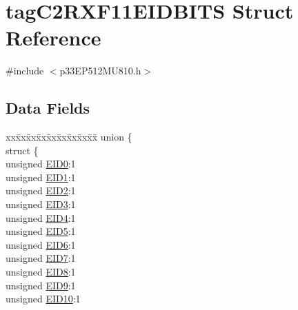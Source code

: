 \hypertarget{structtag_c2_r_x_f11_e_i_d_b_i_t_s}{}\section{tag\+C2\+R\+X\+F11\+E\+I\+D\+B\+I\+TS Struct Reference}
\label{structtag_c2_r_x_f11_e_i_d_b_i_t_s}


{\ttfamily \#include $<$p33\+E\+P512\+M\+U810.\+h$>$}

\subsection*{Data Fields}
\begin{DoxyCompactItemize}
\item 
\begin{tabbing}
xx\=xx\=xx\=xx\=xx\=xx\=xx\=xx\=xx\=\kill
union \{\\
\>struct \{\\
\>\>unsigned \hyperlink{structtag_c2_r_x_f11_e_i_d_b_i_t_s_a9da8b7b30247e4f9cd8cc056549aa9fd}{EID0}:1\\
\>\>unsigned \hyperlink{structtag_c2_r_x_f11_e_i_d_b_i_t_s_afd6c139491d147c1262f3d051c6691e9}{EID1}:1\\
\>\>unsigned \hyperlink{structtag_c2_r_x_f11_e_i_d_b_i_t_s_a36ec62d8d3c5acd5d15e6691dc099a94}{EID2}:1\\
\>\>unsigned \hyperlink{structtag_c2_r_x_f11_e_i_d_b_i_t_s_ab895f7d0ac289a0383b607cbc62eebe2}{EID3}:1\\
\>\>unsigned \hyperlink{structtag_c2_r_x_f11_e_i_d_b_i_t_s_a136d5a709d6618d40acceccb43036656}{EID4}:1\\
\>\>unsigned \hyperlink{structtag_c2_r_x_f11_e_i_d_b_i_t_s_a8dffb2d86a6c184df505ae7c71a58710}{EID5}:1\\
\>\>unsigned \hyperlink{structtag_c2_r_x_f11_e_i_d_b_i_t_s_af8a8574102515d8f1a4b7fd1685d0532}{EID6}:1\\
\>\>unsigned \hyperlink{structtag_c2_r_x_f11_e_i_d_b_i_t_s_a84c3262e67f8d5fd387ac10bde6fa9b1}{EID7}:1\\
\>\>unsigned \hyperlink{structtag_c2_r_x_f11_e_i_d_b_i_t_s_acca25e0b7d86eb499d01f85222baea87}{EID8}:1\\
\>\>unsigned \hyperlink{structtag_c2_r_x_f11_e_i_d_b_i_t_s_ac6748f73d4ada8538b06548be4f396c2}{EID9}:1\\
\>\>unsigned \hyperlink{structtag_c2_r_x_f11_e_i_d_b_i_t_s_a9cea8e77ecbb72bd3b08102412793725}{EID10}:1\\

\end{tabbing}
\end{DoxyCompactItemize}
